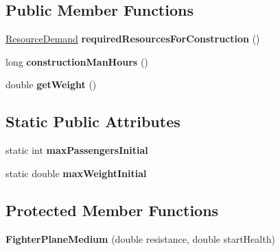 \subsection*{Public Member Functions}
\begin{DoxyCompactItemize}
\item 
\hyperlink{classuniverse_1_1_resource_demand}{Resource\+Demand} {\bfseries required\+Resources\+For\+Construction} ()\hypertarget{classtools_1_1vehicles_1_1air_1_1_fighter_plane_medium_a8666c9a78998b0e46b83ee7e68c30132}{}\label{classtools_1_1vehicles_1_1air_1_1_fighter_plane_medium_a8666c9a78998b0e46b83ee7e68c30132}

\item 
long {\bfseries construction\+Man\+Hours} ()\hypertarget{classtools_1_1vehicles_1_1air_1_1_fighter_plane_medium_a879eff847ad49c0b134a2fd188577f0e}{}\label{classtools_1_1vehicles_1_1air_1_1_fighter_plane_medium_a879eff847ad49c0b134a2fd188577f0e}

\item 
double {\bfseries get\+Weight} ()\hypertarget{classtools_1_1vehicles_1_1air_1_1_fighter_plane_medium_a068228a032143149eadb813dad1272fc}{}\label{classtools_1_1vehicles_1_1air_1_1_fighter_plane_medium_a068228a032143149eadb813dad1272fc}

\end{DoxyCompactItemize}
\subsection*{Static Public Attributes}
\begin{DoxyCompactItemize}
\item 
static int {\bfseries max\+Passengers\+Initial}\hypertarget{classtools_1_1vehicles_1_1air_1_1_fighter_plane_medium_a2eea43198968fe94274e7dcbfa44ad9b}{}\label{classtools_1_1vehicles_1_1air_1_1_fighter_plane_medium_a2eea43198968fe94274e7dcbfa44ad9b}

\item 
static double {\bfseries max\+Weight\+Initial}\hypertarget{classtools_1_1vehicles_1_1air_1_1_fighter_plane_medium_a47a25777e60797f1b5398a91e679b466}{}\label{classtools_1_1vehicles_1_1air_1_1_fighter_plane_medium_a47a25777e60797f1b5398a91e679b466}

\end{DoxyCompactItemize}
\subsection*{Protected Member Functions}
\begin{DoxyCompactItemize}
\item 
{\bfseries Fighter\+Plane\+Medium} (double resistance, double start\+Health)\hypertarget{classtools_1_1vehicles_1_1air_1_1_fighter_plane_medium_a9011e63a389d2c370f04e6b4f6a5801e}{}\label{classtools_1_1vehicles_1_1air_1_1_fighter_plane_medium_a9011e63a389d2c370f04e6b4f6a5801e}

\end{DoxyCompactItemize}
